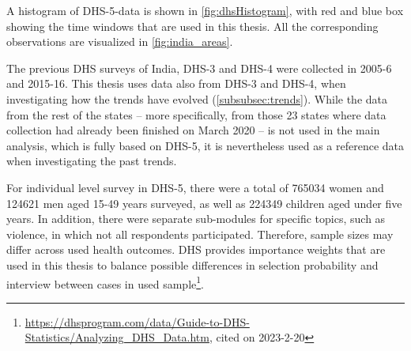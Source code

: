 \documentclass[12pt,a4paper,notitlepage]{article}
\begin{document}
A histogram of DHS-5-data is shown in \cref{fig:dhsHistogram}, with red and blue box showing the time windows that are used in this thesis. All the corresponding observations are visualized in \cref{fig:india_areas}.

The previous DHS surveys of India, DHS-3 and DHS-4 were collected in 2005-6 and 2015-16. This thesis uses data also from DHS-3 and DHS-4, when investigating how the trends have evolved (\cref{subsubsec:trends}). While the data from the rest of the states -- more specifically, from those 23 states where data collection had already been finished on March 2020 -- is not used in the main analysis, which is fully based on DHS-5, it is nevertheless used as a reference data when investigating the past trends.

For individual level survey in DHS-5, there were a total of 765034 women and 124621 men aged 15-49 years surveyed, as well as 224349 children aged under five years. In addition, there were separate sub-modules for specific topics, such as violence, in which not all respondents participated. Therefore, sample sizes may differ across used health outcomes. DHS provides importance weights that are used in this thesis to balance possible differences in selection probability and interview between cases in used sample\footnote{\url{https://dhsprogram.com/data/Guide-to-DHS-Statistics/Analyzing_DHS_Data.htm}, cited on 2023-2-20}.
\end{document}
